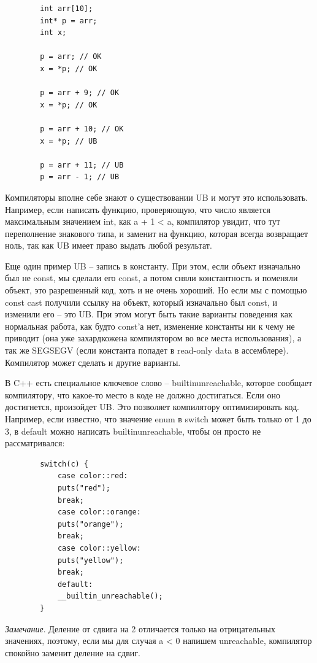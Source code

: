 \documentclass[12pt, a4paper]{article}
\begin{document}
	\begin{verbatim}
		int arr[10];
		int* p = arr;
		int x;
		
		p = arr; // OK
		x = *p; // OK
		
		p = arr + 9; // OK
		x = *p; // OK
		
		p = arr + 10; // OK
		x = *p; // UB
		
		p = arr + 11; // UB
		p = arr - 1; // UB
	\end{verbatim}
	\par Компиляторы вполне себе знают о существовании UB и могут это использовать. Например, если написать функцию, проверяющую, что число является максимальным значением int, как a + 1 < a, компилятор увидит, что тут переполнение знакового типа, и заменит на функцию, которая всегда возвращает ноль, так как UB имеет право выдать любой результат.
	\\\par Еще один пример UB -- запись в константу. При этом, если объект изначально был не const, мы сделали его const, а потом сняли константность и поменяли объект, это разрешенный код, хоть и не очень хороший. Но если мы с помощью const cast получили ссылку на объект, который изначально был const, и изменили его -- это UB. При этом могут быть такие варианты поведения как нормальная работа, как будто const'а нет, изменение константы ни к чему не приводит (она уже захардкожена компилятором во все места использования), а так же SEGSEGV (если константа попадет в read-only data в ассемблере). Компилятор может сделать и другие варианты.
	\\\par В C++ есть специальное ключевое слово -- \textunderscore\textunderscore builtin\textunderscore unreachable, которое сообщает компилятору, что какое-то место в коде не должно достигаться. Если оно достигнется, произойдет UB. Это позволяет компилятору оптимизировать код. Например, если известно, что значение enum в switch может быть только от 1 до 3, в default можно написать \textunderscore\textunderscore builtin\textunderscore unreachable, чтобы он просто не рассматривался:
	\begin{verbatim}
		switch(c) {
			case color::red:
			puts("red");
			break;
			case color::orange:
			puts("orange");
			break;
			case color::yellow:
			puts("yellow");
			break;
			default:
			__builtin_unreachable();
		}
	\end{verbatim}
	\textit{Замечание}. Деление от сдвига на 2 отличается только на отрицательных значениях, поэтому, если мы для случая a < 0 напишем unreachable, компилятор спокойно заменит деление на сдвиг.
\end{document}
